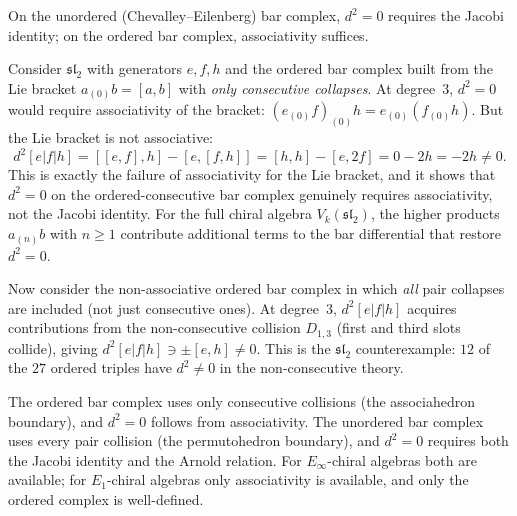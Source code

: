 \begin{remark}
\label{rem:jacobi-not-needed}
On the unordered (Chevalley--Eilenberg) bar complex, $d^2=0$
requires the Jacobi identity; on the ordered bar complex,
associativity suffices.

Consider $\mathfrak{sl}_2$ with generators $e,f,h$
and the ordered bar complex built from the Lie bracket
$a_{(0)}b=[a,b]$ with \emph{only consecutive
collapses}. At degree~$3$,
$d^2=0$ would require associativity of the bracket:
$(e_{(0)}f)_{(0)}h=e_{(0)}(f_{(0)}h)$. But the Lie bracket
is not associative:
\[
 d^2[e|f|h]
 =[[e,f],h]-[e,[f,h]]
 =[h,h]-[e,2f]
 =0-2h
 =-2h\ne 0.
\]
This is exactly the failure of associativity for the Lie
bracket, and it shows that $d^2=0$ on the ordered-consecutive
bar complex genuinely requires associativity, not the Jacobi
identity. For the full chiral algebra $V_k(\mathfrak{sl}_2)$,
the higher products $a_{(n)}b$ with $n\ge 1$ contribute
additional terms to the bar differential that restore $d^2=0$.

Now consider the non-associative ordered bar complex in
which \emph{all} pair collapses are included (not just
consecutive ones). At degree~$3$, $d^2[e|f|h]$ acquires
contributions from the non-consecutive collision $D_{1,3}$
(first and third slots collide), giving
$d^2[e|f|h]\ni\pm[e,h]\ne 0$. This is the
$\mathfrak{sl}_2$ counterexample: $12$ of the $27$
ordered triples have $d^2\ne 0$ in the non-consecutive
theory.

The ordered bar complex uses only consecutive collisions (the
associahedron boundary), and $d^2=0$ follows from associativity.
The unordered bar complex uses every pair collision (the
permutohedron boundary), and $d^2=0$ requires both the Jacobi
identity and the Arnold relation. For $E_\infty$-chiral algebras
both are available; for $E_1$-chiral algebras only associativity
is available, and only the ordered complex is well-defined.
\end{remark}

